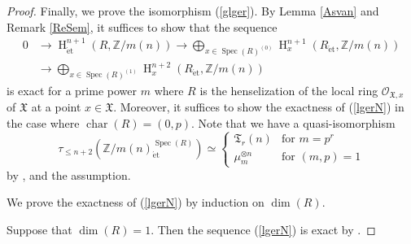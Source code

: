 \documentclass{article}
\newcommand{\spec}{\operatorname{Spec}}
\newcommand{\et}{\mathrm{\acute{e}t}}
\newcommand{\HO}{\operatorname{H}}
\begin{document}
\begin{proof}
Finally, we prove the isomorphism (\ref{glger}).
By Lemma \ref{Asvan} and Remark \ref{ReSem}, it suffices to show that the sequence
%
\begin{align}\label{lgerN}
0
&\to
\HO^{n+1}_{\et}(R, \mathbb{Z}/m(n))
\to
\displaystyle\bigoplus_{x\in \spec(R)^{(0)}}
\HO^{n+1}_{x}(
R_{\et},
\mathbb{Z}/m(n)
) \nonumber
\\
&\to
\displaystyle\bigoplus_{x\in \spec(R)^{(1)}}
\HO^{n+2}_{x}(
R_{\et},
\mathbb{Z}/m(n)
)
\end{align}
%
is exact 
for a prime power $m$
where $R$ is the henselization of the local ring 
$\mathcal{O}_{\mathfrak{X}, x}$ of $\mathfrak{X}$ at a point $x\in \mathfrak{X}$.
Moreover, it suffices to show the exactness of (\ref{lgerN}) in the case where $\operatorname{char}(R)=(0, p)$.
Note that we have a quasi-isomorphism
%
\begin{equation*}
\tau_{\leq n+2}\left(
\mathbb{Z}/m(n)_{\et}^{\spec(R)}
\right)
\simeq 
%
\begin{cases}
\mathfrak{T}_{r}(n)
&
\text{for $m=p^{r}$}
\\
\mu_{m}^{\otimes n}
&
\text{for $(m, p)=1$}
\end{cases}
%
\end{equation*}
%
by \cite[p.209, Remark 7.2]{SaR}, \cite[Remark 4.7]{Sak4} and the assumption.

We prove the exactness of (\ref{lgerN}) by induction on $\operatorname{dim}(R)$. 

Suppose that $\operatorname{dim}(R)=1$. Then the sequence (\ref{lgerN}) is exact by
\cite[p.30, Theorem 1.1]{SM}.


\end{proof}
\end{document}
